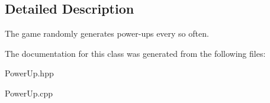 \subsection{Detailed Description}
The game randomly generates power-\/ups every so often. 

The documentation for this class was generated from the following files\+:\begin{DoxyCompactItemize}
\item 
Power\+Up.\+hpp\item 
Power\+Up.\+cpp\end{DoxyCompactItemize}
